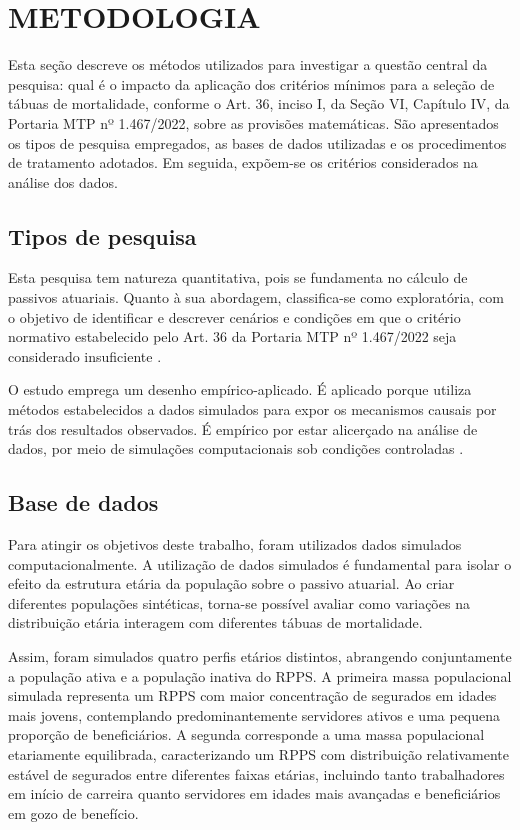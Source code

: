 \chapter{\textbf{METODOLOGIA}}
Esta seção descreve os métodos utilizados para investigar a questão central da pesquisa: qual é o impacto da aplicação dos critérios mínimos para a seleção de tábuas de mortalidade, conforme o Art. 36, inciso I, da Seção VI, Capítulo IV, da Portaria MTP nº 1.467/2022, sobre as provisões matemáticas. São apresentados os tipos de pesquisa empregados, as bases de dados utilizadas e os procedimentos de tratamento adotados. Em seguida, expõem-se os critérios considerados na análise dos dados.

\section{\textbf{Tipos de pesquisa}}
Esta pesquisa tem natureza quantitativa, pois se fundamenta no cálculo de passivos atuariais. Quanto à sua abordagem, classifica-se como exploratória, com o objetivo de identificar e descrever cenários e condições em que o critério normativo estabelecido pelo Art. 36 da Portaria MTP nº 1.467/2022 seja considerado insuficiente \cite{gil2008}.

O estudo emprega um desenho empírico-aplicado. É aplicado porque utiliza métodos estabelecidos a dados simulados para expor os mecanismos causais por trás dos resultados observados. É empírico por estar alicerçado na análise de dados, por meio de simulações computacionais sob condições controladas \cite{richardson2017}. 

\section{\textbf{Base de dados}}
Para atingir os objetivos deste trabalho, foram utilizados dados simulados computacionalmente. A utilização de dados simulados é fundamental para isolar o efeito da estrutura etária da população sobre o passivo atuarial. Ao criar diferentes populações sintéticas, torna-se possível avaliar como variações na distribuição etária interagem com diferentes tábuas de mortalidade.

Assim, foram simulados quatro perfis etários distintos, abrangendo conjuntamente a população ativa e a população inativa do RPPS. A primeira massa populacional simulada representa um RPPS com maior concentração de segurados em idades mais jovens, contemplando predominantemente servidores ativos e uma pequena proporção de beneficiários. A segunda corresponde a uma massa populacional etariamente equilibrada, caracterizando um RPPS com distribuição relativamente estável de segurados entre diferentes faixas etárias, incluindo tanto trabalhadores em início de carreira quanto servidores em idades mais avançadas e beneficiários em gozo de benefício. 

